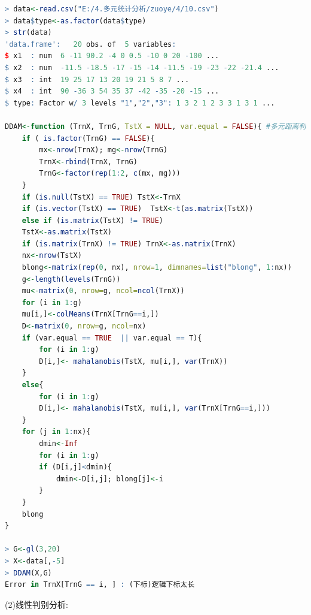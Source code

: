 \documentclass[11pt,a4paper]{ctexart}
\begin{document}
\begin{lstlisting}[language=r]
> data<-read.csv("E:/4.多元统计分析/zuoye/4/10.csv")
> data$type<-as.factor(data$type)
> str(data)
'data.frame':	20 obs. of  5 variables:
$ x1  : num  6 -11 90.2 -4 0 0.5 -10 0 20 -100 ...
$ x2  : num  -11.5 -18.5 -17 -15 -14 -11.5 -19 -23 -22 -21.4 ...
$ x3  : int  19 25 17 13 20 19 21 5 8 7 ...
$ x4  : int  90 -36 3 54 35 37 -42 -35 -20 -15 ...
$ type: Factor w/ 3 levels "1","2","3": 1 3 2 1 2 3 3 1 3 1 ...

DDAM<-function (TrnX, TrnG, TstX = NULL, var.equal = FALSE){ #多元距离判别函数
	if ( is.factor(TrnG) == FALSE){
		mx<-nrow(TrnX); mg<-nrow(TrnG)
		TrnX<-rbind(TrnX, TrnG)
		TrnG<-factor(rep(1:2, c(mx, mg)))
	}
	if (is.null(TstX) == TRUE) TstX<-TrnX
	if (is.vector(TstX) == TRUE)  TstX<-t(as.matrix(TstX))
	else if (is.matrix(TstX) != TRUE)
	TstX<-as.matrix(TstX)
	if (is.matrix(TrnX) != TRUE) TrnX<-as.matrix(TrnX)
	nx<-nrow(TstX)
	blong<-matrix(rep(0, nx), nrow=1, dimnames=list("blong", 1:nx))
	g<-length(levels(TrnG))
	mu<-matrix(0, nrow=g, ncol=ncol(TrnX))
	for (i in 1:g)
	mu[i,]<-colMeans(TrnX[TrnG==i,]) 
	D<-matrix(0, nrow=g, ncol=nx)
	if (var.equal == TRUE  || var.equal == T){
		for (i in 1:g)
		D[i,]<- mahalanobis(TstX, mu[i,], var(TrnX))
	}
	else{
		for (i in 1:g)
		D[i,]<- mahalanobis(TstX, mu[i,], var(TrnX[TrnG==i,]))
	}
	for (j in 1:nx){
		dmin<-Inf
		for (i in 1:g)
		if (D[i,j]<dmin){
			dmin<-D[i,j]; blong[j]<-i
		}
	}
	blong
}

> G<-gl(3,20)
> X<-data[,-5]
> DDAM(X,G)
Error in TrnX[TrnG == i, ] : (下标)逻辑下标太长 
\end{lstlisting}
(2)线性判别分析:
\end{document}
